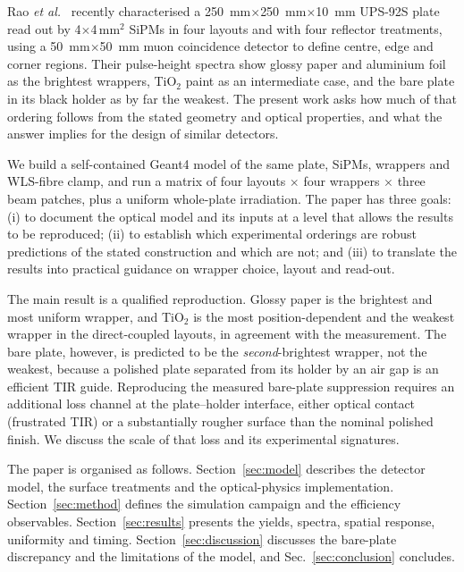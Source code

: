 \documentclass[preprint,12pt]{elsarticle}
\newcommand{\gfour}{Geant4}
\begin{document}
Rao \emph{et al.}~\cite{Rao2025} recently characterised a
\SI{250}{\milli\meter}$\times$\SI{250}{\milli\meter}$\times$\SI{10}{\milli\meter}
UPS-92S plate read out by 4$\times$4\,mm$^2$ SiPMs in four layouts and with four
reflector treatments, using a \SI{50}{\milli\meter}$\times$\SI{50}{\milli\meter}
muon coincidence detector to define centre, edge and corner regions. Their
pulse-height spectra show glossy paper and aluminium foil as the brightest
wrappers, TiO$_2$ paint as an intermediate case, and the bare plate in its black
holder as by far the weakest. The present work asks how much of that ordering
follows from the stated geometry and optical properties, and what the answer
implies for the design of similar detectors.

We build a self-contained \gfour{} model of the same plate, SiPMs, wrappers and
WLS-fibre clamp, and run a matrix of four layouts $\times$ four wrappers
$\times$ three beam patches, plus a uniform whole-plate irradiation. The paper
has three goals: (i) to document the optical model and its inputs at a level
that allows the results to be reproduced; (ii) to establish which experimental
orderings are robust predictions of the stated construction and which are not;
and (iii) to translate the results into practical guidance on wrapper choice,
layout and read-out.

The main result is a qualified reproduction. Glossy paper is the brightest and
most uniform wrapper, and TiO$_2$ is the most position-dependent and the weakest
wrapper in the direct-coupled layouts, in agreement with the measurement. The
bare plate, however, is predicted to be the \emph{second}-brightest wrapper, not
the weakest, because a polished plate separated from its holder by an air gap is
an efficient TIR guide. Reproducing the measured bare-plate suppression requires
an additional loss channel at the plate--holder interface, either optical contact
(frustrated TIR) or a substantially rougher surface than the nominal polished
finish. We discuss the scale of that loss and its experimental signatures.

The paper is organised as follows. Section~\ref{sec:model} describes the
detector model, the surface treatments and the optical-physics implementation.
Section~\ref{sec:method} defines the simulation campaign and the efficiency
observables. Section~\ref{sec:results} presents the yields, spectra, spatial
response, uniformity and timing. Section~\ref{sec:discussion} discusses the
bare-plate discrepancy and the limitations of the model, and
Sec.~\ref{sec:conclusion} concludes.
\end{document}
